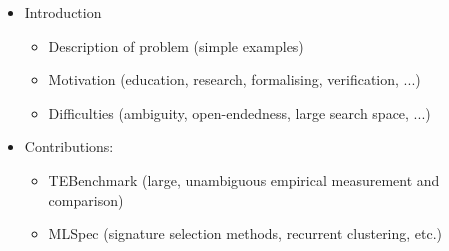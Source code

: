 \documentclass{article}
\begin{document}
\maketitle

\begin{itemize}
\item Introduction
  \begin{itemize}
  \item Description of problem (simple examples)
  \item Motivation (education, research, formalising, verification, ...)
  \item Difficulties (ambiguity, open-endedness, large search space, ...)
  \end{itemize}

\item Contributions:
  \begin{itemize}
  \item TEBenchmark (large, unambiguous empirical measurement and comparison)
  \item MLSpec (signature selection methods, recurrent clustering, etc.)
  \end{itemize}


\end{itemize}
\end{document}
